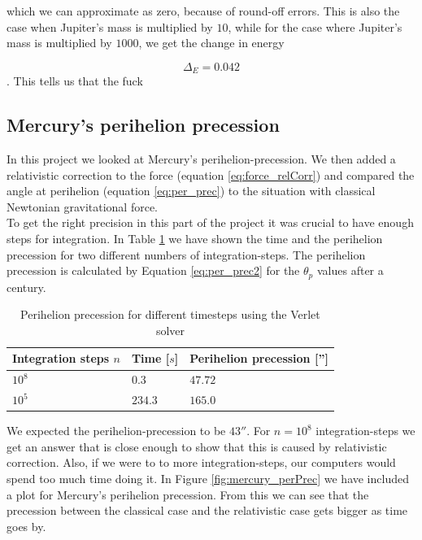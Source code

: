 \documentclass[%
 reprint,
 nobalance,
 amsmath,amssymb,
 aps,
]{revtex4-1}
\begin{document}
which we can approximate as zero, because of round-off errors. This is also the case when Jupiter's mass is multiplied by $10$, while for the case where Jupiter's mass is multiplied by $1000$, we get the change in energy

\begin{equation}
\Delta_{E} = 0.042
\end{equation}
. This tells us that the fuck


\subsection{\label{sec:Sub3}Mercury's perihelion precession}

In this project we looked at Mercury's perihelion-precession. We then added a relativistic correction to the force (equation \eqref{eq:force_relCorr}) and compared the angle at perihelion (equation \eqref{eq:per_prec}) to the situation with classical Newtonian gravitational force.\\
To get the right precision in this part of the project it was crucial to have enough steps for integration. In Table \ref{table:perPrec} we have shown the time and the perihelion precession for two different numbers of integration-steps. The perihelion precession is calculated by Equation \eqref{eq:per_prec2} for the $\theta_p$ values after a century.

\begin{table}[h]
\centering
\caption{Perihelion precession for different timesteps using the Verlet solver}
\label{table:perPrec}
\begin{tabular}{|l|l|l|}
\hline
\textbf{Integration steps $n$} & \textbf{Time {[}$s${]}} & \textbf{Perihelion precession {[}''{]}} \\ \hline
$10^8$                 & $0.3$                   & $47.72$                                \\ \hline
$10^5$                 & $234.3$                 & $165.0$                                \\ \hline
\end{tabular}
\end{table}


We expected the perihelion-precession to be $43''$. For $n=10^8$ integration-steps we get an answer that is close enough to show that this is caused by relativistic correction. Also, if we were to to more integration-steps, our computers would spend too much time doing it.
 In Figure \ref{fig:mercury_perPrec} we have included a plot for Mercury's perihelion precession. From this we can see that the precession between the classical case and the relativistic case gets bigger as time goes by.
\end{document}
